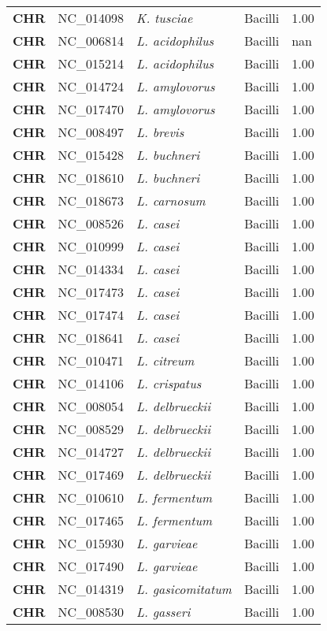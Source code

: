 \begin{adjustwidth}{-3cm}{2cm}
{\begin{supertabular}{>{\bfseries}l|p{0.1\textwidth}p{0.14\textwidth}l|l}
CHR & NC\_014098 & \textit{K. tusciae} & Bacilli & 1.00\\
CHR & NC\_006814 & \textit{L. acidophilus} & Bacilli & nan\\
CHR & NC\_015214 & \textit{L. acidophilus} & Bacilli & 1.00\\
CHR & NC\_014724 & \textit{L. amylovorus} & Bacilli & 1.00\\
CHR & NC\_017470 & \textit{L. amylovorus} & Bacilli & 1.00\\
CHR & NC\_008497 & \textit{L. brevis} & Bacilli & 1.00\\
CHR & NC\_015428 & \textit{L. buchneri} & Bacilli & 1.00\\
CHR & NC\_018610 & \textit{L. buchneri} & Bacilli & 1.00\\
CHR & NC\_018673 & \textit{L. carnosum} & Bacilli & 1.00\\
CHR & NC\_008526 & \textit{L. casei} & Bacilli & 1.00\\
CHR & NC\_010999 & \textit{L. casei} & Bacilli & 1.00\\
CHR & NC\_014334 & \textit{L. casei} & Bacilli & 1.00\\
CHR & NC\_017473 & \textit{L. casei} & Bacilli & 1.00\\
CHR & NC\_017474 & \textit{L. casei} & Bacilli & 1.00\\
CHR & NC\_018641 & \textit{L. casei} & Bacilli & 1.00\\
CHR & NC\_010471 & \textit{L. citreum} & Bacilli & 1.00\\
CHR & NC\_014106 & \textit{L. crispatus} & Bacilli & 1.00\\
CHR & NC\_008054 & \textit{L. delbrueckii} & Bacilli & 1.00\\
CHR & NC\_008529 & \textit{L. delbrueckii} & Bacilli & 1.00\\
CHR & NC\_014727 & \textit{L. delbrueckii} & Bacilli & 1.00\\
CHR & NC\_017469 & \textit{L. delbrueckii} & Bacilli & 1.00\\
CHR & NC\_010610 & \textit{L. fermentum} & Bacilli & 1.00\\
CHR & NC\_017465 & \textit{L. fermentum} & Bacilli & 1.00\\
CHR & NC\_015930 & \textit{L. garvieae} & Bacilli & 1.00\\
CHR & NC\_017490 & \textit{L. garvieae} & Bacilli & 1.00\\
CHR & NC\_014319 & \textit{L. gasicomitatum} & Bacilli & 1.00\\
CHR & NC\_008530 & \textit{L. gasseri} & Bacilli & 1.00\\

\end{supertabular}}
\end{adjustwidth}
